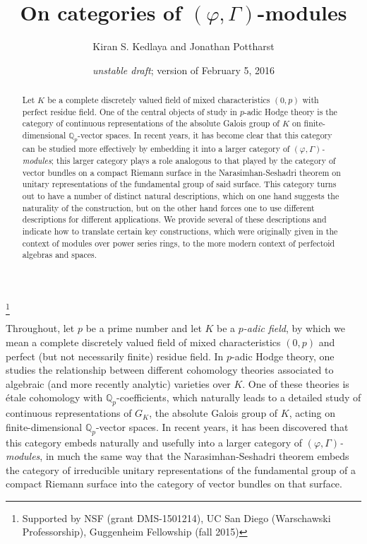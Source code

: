 \documentclass[12pt]{amsart}
\theoremstyle{definition}
\numberwithin{equation}{theorem}
\newcommand{\QQ}{\mathbb{Q}}
\begin{document}
\title{On categories of $(\varphi, \Gamma)$-modules}
\author{Kiran S. Kedlaya and Jonathan Pottharst}
\thanks{Supported by NSF (grant DMS-1501214), UC San Diego (Warschawski Professorship), Guggenheim Fellowship (fall 2015)}
\date{\textit{unstable draft}; version of February 5, 2016}

\begin{abstract}
Let $K$ be a complete discretely valued field of mixed characteristics $(0,p)$ with perfect residue field. One of the central objects of study in $p$-adic Hodge theory is the cate\-gory of continuous representations of the absolute Galois group of $K$ on finite-dimensional $\QQ_p$-vector spaces. In recent years, it has become clear that this category can be studied more effectively by embedding it into a larger category of \emph{$(\varphi, \Gamma)$-modules}; this larger category plays a role analogous to that played by the category of vector bundles on a compact Riemann surface in the Narasimhan-Seshadri theorem on unitary representations of the fundamental group of said surface. This category turns out to have a number of distinct natural descriptions, which on one hand suggests the naturality of the construction, but on the other hand forces one to use different descriptions for different applications. We provide several of these descriptions and indicate how to translate certain key constructions, which were originally given in the context of modules over power series rings, to the more modern context of perfectoid algebras and spaces.
\end{abstract}

\maketitle

Throughout, let $p$ be a prime number and let $K$ be a \emph{$p$-adic field}, by which we mean a complete discretely valued field of mixed characteristics $(0,p)$ and perfect (but not necessarily finite) residue field. In $p$-adic Hodge theory, one studies the relationship between different cohomology theories associated to algebraic (and more recently analytic) varieties over $K$. One of these theories is \'etale cohomology with $\QQ_p$-coefficients, which naturally leads to a detailed study of continuous representations of $G_K$, the absolute Galois group of $K$, acting on finite-dimensional $\QQ_p$-vector spaces. In recent years, it has been discovered that this category embeds naturally and usefully into a larger category of \emph{$(\varphi, \Gamma)$-modules}, in much the same way that the Narasimhan-Seshadri theorem embeds the category of irreducible unitary representations of the fundamental group of a compact Riemann surface into the category of vector bundles on that surface.
\end{document}
